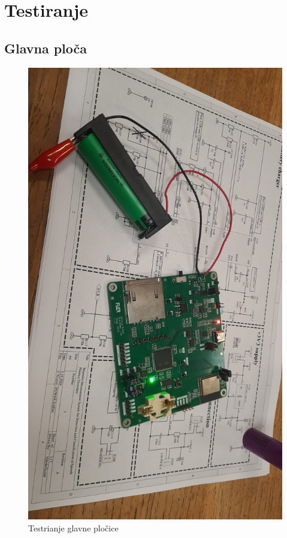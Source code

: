 \chapter{Testiranje}
\section{Glavna ploča}
\begin{figure}[htb]
    \centering
    \includegraphics[width=10 cm]{Figures/MB_TEST_01.jpg}
    \caption{Testrianje glavne pločice}
    \label{slk:MB_TEST_01}
\end{figure}
